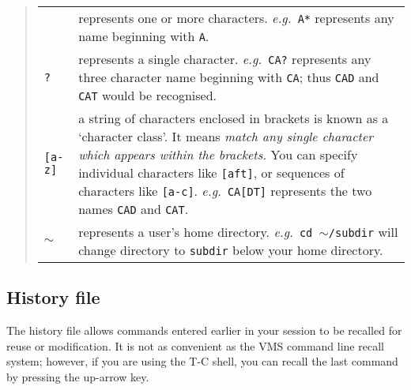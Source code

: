 \begin{quote}
\begin{tabular}{lp{5in}}

{\tt  *}  & represents one or more characters.
  {\em e.g.}\, {\tt A*} represents any name beginning with {\tt A}.\\

{\tt  ?}  & represents a single character.
  {\em e.g.}\, {\tt CA?} represents any three character name beginning
  with {\tt CA}; thus {\tt CAD} and {\tt CAT} would be recognised.\\

{\tt  [a-z]}   & a string of characters enclosed in brackets is known as a
  `character class'.
  It means {\em match any single character which appears within the brackets.}
  You can specify individual characters like {\tt [aft]}, or sequences of
  characters like {\tt [a-c]}.
  {\em e.g.}\, {\tt CA[DT]} represents the two names {\tt CAD} and {\tt CAT}. \\

{\bf $\sim$}   & represents a user's home directory.
  {\em e.g.}\, {\tt cd {\bf $\sim$}/subdir} will change directory to
  {\tt subdir} below your home directory.

\end{tabular}
\end{quote}


\subsection{History file}

The history file allows commands entered earlier in your session to be recalled
for reuse or modification.
It is not as convenient as the VMS command line recall system; however, if you
are using the T-C shell, you can recall the last command by pressing the
up-arrow key.

